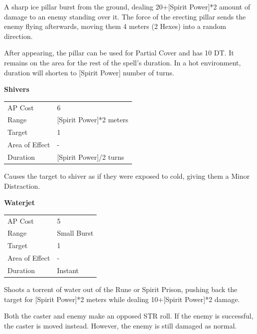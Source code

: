\documentclass[11pt,a4paper,twocolumn]{book}
\begin{document}
A sharp ice pillar burst from the ground, dealing 20+[Spirit Power]*2 amount of damage to an enemy standing over it. The force of the erecting pillar sends the enemy flying afterwards, moving them 4 meters (2 Hexes) into a random direction.

After appearing, the pillar can be used for Partial Cover and has 10 DT. It remains on the area for the rest of the spell's duration. In a hot environment, duration will shorten to [Spirit Power] number of turns.


\bigskip
\noindent
\textbf{Shivers}

\smallskip
{
	\begin{tabu} to 70mm{| X[l,4] | X[l,7] |}
		\hline
        AP Cost	      	& 6 						\\
        Range     		& [Spirit Power]*2 meters				\\
        Target      	& 1		\\
        Area of Effect  & -  	 			\\
        Duration     	& [Spirit Power]/2 turns		\\ \hline
	\end{tabu}
		
}
\smallskip

Causes the target to shiver as if they were exposed to cold, giving them a Minor Distraction.

\bigskip
\noindent
\textbf{Waterjet}

\smallskip
{
	\begin{tabu} to 70mm{| X[l,4] | X[l,7] |}
		\hline
        AP Cost	      	& 5 						\\
        Range     		& Small Burst				\\
        Target      	& 1		\\
        Area of Effect  & -  	 			\\
        Duration     	& Instant		\\ \hline
	\end{tabu}
		
}
\smallskip

Shoots a torrent of water out of the Rune or Spirit Prison, pushing back the target for [Spirit Power]*2 meters while dealing 10+[Spirit Power]*2 damage.

Both the caster and enemy make an opposed STR roll. If the enemy is successful, the caster is moved instead. However, the enemy is still damaged as normal.
\end{document}
